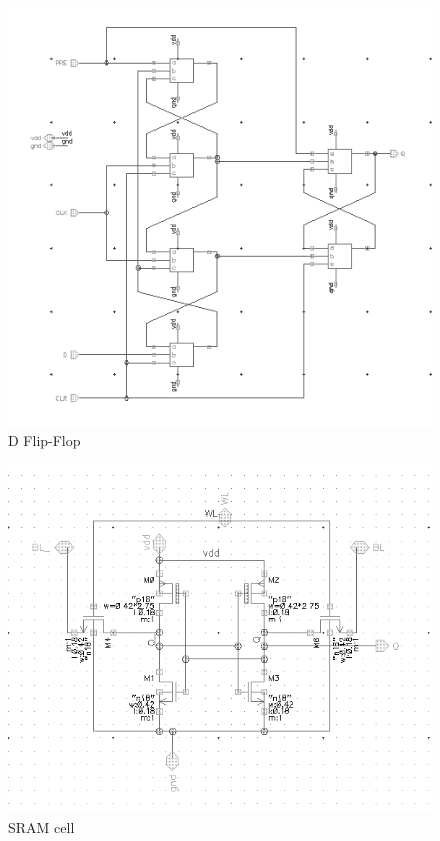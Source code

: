 \begin{figure}[H]
\centering
\includegraphics[scale=0.7]{DFF0.png}
\caption{D Flip-Flop}
\label{fig:Figure}
\end{figure}
\begin{figure}[H]
\centering
\includegraphics[scale=0.7]{sram_cell.png}
\caption{SRAM cell}
\label{fig:Figure}
\end{figure}
